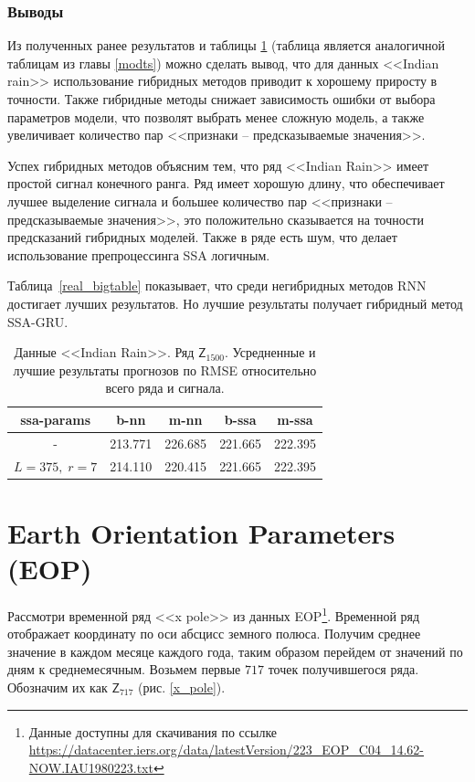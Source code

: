 \documentclass[specialist,
               substylefile = spbu.rtx,
               subf,href,colorlinks=true, 12p]{disser}
\begin{document}
\subsubsection{Выводы}
Из полученных ранее результатов и таблицы \ref{train} (таблица является аналогичной таблицам из главы \ref{modts}) можно сделать вывод, что для данных <<Indian rain>> использование гибридных методов приводит к хорошему приросту в точности. Также гибридные методы снижает зависимость ошибки от выбора параметров модели, что позволят выбрать менее сложную модель, а также увеличивает количество пар <<признаки -- предсказываемые значения>>.

Успех гибридных методов объясним тем, что ряд <<Indian Rain>> имеет простой сигнал конечного ранга. Ряд имеет хорошую длину, что обеспечивает лучшее выделение сигнала и большее количество пар <<признаки -- предсказываемые значения>>, это положительно сказывается на точности предсказаний гибридных моделей. Также в ряде есть шум, что делает использование препроцессинга SSA логичным.

Таблица~\ref{real_bigtable} показывает, что среди негибридных методов RNN достигает лучших результатов. Но лучшие результаты получает гибридный метод SSA-GRU.

\begin{table}[h]
	\captionsetup{justification=centering}
	\caption{Данные <<Indian Rain>>. Ряд $\mathsf{Z}_{1500}$. Усредненные и лучшие результаты прогнозов по RMSE относительно всего ряда и сигнала.}
	\begin{center}
		\begin{tabular}{ccccc}
			\toprule
			{ssa-params} &    b-nn &    m-nn &   b-ssa &   m-ssa \\
			\midrule
			-          & 213.771 & 226.685 & 221.665 & 222.395 \\
			$L = 375, \; r = 7$    & 214.110 & 220.415 & 221.665 & 222.395 \\
			\bottomrule
		\end{tabular}
	\end{center}
	\label{train}
\end{table}

\clearpage

\section{Earth Orientation Parameters (EOP)}
\label{eop}

Рассмотри временной ряд <<x pole>> из данных EOP\footnote{Данные доступны для скачивания по ссылке \url{https://datacenter.iers.org/data/latestVersion/223_EOP_C04_14.62-NOW.IAU1980223.txt}}.
Временной ряд отображает координату по оси абсцисс земного полюса. Получим среднее значение в каждом месяце каждого года, таким образом перейдем от значений по дням к среднемесячным. Возьмем первые $717$ точек получившегося ряда. Обозначим их как $\mathsf{Z}_{717}$ (рис. \ref{x_pole}).
\end{document}
